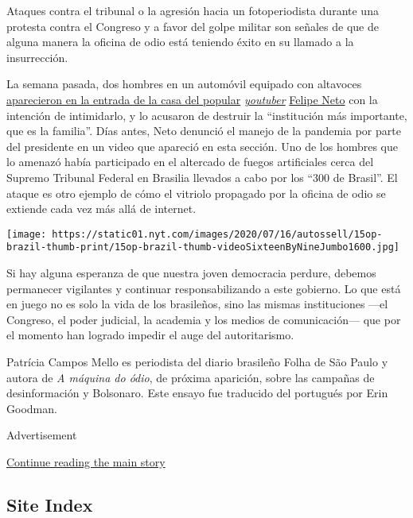 Ataques contra el tribunal o la agresión hacia un fotoperiodista durante
una protesta contra el Congreso y a favor del golpe militar son señales
de que de alguna manera la oficina de odio está teniendo éxito en su
llamado a la insurrección.

La semana pasada, dos hombres en un automóvil equipado con altavoces
\href{https://esportes.yahoo.com/noticias/aliados-jair-bolsonaro-atacam-casa-felipe-neto-010129218.html}{aparecieron
en la entrada de la casa del popular}
\href{https://esportes.yahoo.com/noticias/aliados-jair-bolsonaro-atacam-casa-felipe-neto-010129218.html}{\emph{youtuber}}
\href{https://esportes.yahoo.com/noticias/aliados-jair-bolsonaro-atacam-casa-felipe-neto-010129218.html}{Felipe
Neto} con la intención de intimidarlo, y lo acusaron de destruir la
``institución más importante, que es la familia''. Días antes, Neto
denunció el manejo de la pandemia por parte del presidente en un video
que apareció en esta sección. Uno de los hombres que lo amenazó había
participado en el altercado de fuegos artificiales cerca del Supremo
Tribunal Federal en Brasilia llevados a cabo por los ``300 de Brasil''.
El ataque es otro ejemplo de cómo el vitriolo propagado por la oficina
de odio se extiende cada vez más allá de internet.

\texttt{[image: https://static01.nyt.com/images/2020/07/16/autossell/15op-brazil-thumb-print/15op-brazil-thumb-videoSixteenByNineJumbo1600.jpg]}

Si hay alguna esperanza de que nuestra joven democracia perdure, debemos
permanecer vigilantes y continuar responsabilizando a este gobierno. Lo
que está en juego no es solo la vida de los brasileños, sino las mismas
instituciones ---el Congreso, el poder judicial, la academia y los
medios de comunicación--- que por el momento han logrado impedir el auge
del autoritarismo.

Patrícia Campos Mello es periodista del diario brasileño Folha de São
Paulo y autora de \emph{A máquina do ódio}, de próxima aparición, sobre
las campañas de desinformación y Bolsonaro. Este ensayo fue traducido
del portugués por Erin Goodman.

Advertisement

\protect\hyperlink{after-bottom}{Continue reading the main story}

\hypertarget{site-index}{%
\subsection{Site Index}\label{site-index}}

